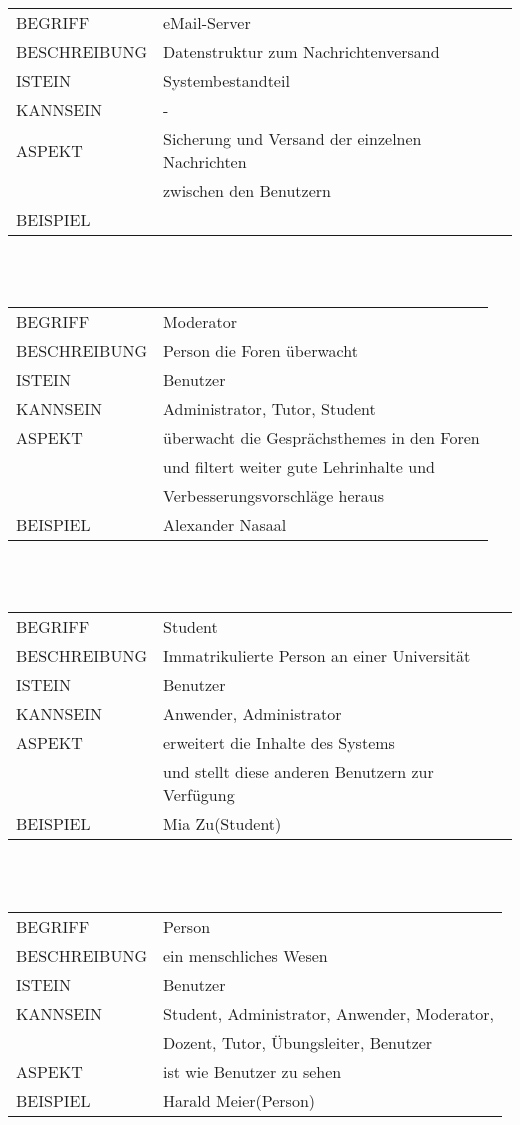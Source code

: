 \documentclass[12pt,a4paper]{article}
\begin{document}
\begin{tabular}{l p{10cm}}
BEGRIFF 	 & eMail-Server \\ 
BESCHREIBUNG & Datenstruktur zum Nachrichtenversand \\
ISTEIN   	 & Systembestandteil \\
KANNSEIN 	 & - \\ 
ASPEKT   	 & Sicherung und Versand der einzelnen Nachrichten\\
			 & zwischen den Benutzern \\
BEISPIEL 	 & \\
\hline
\end{tabular}\\\\   

\begin{tabular}{l p{10cm}}
BEGRIFF 	 & Moderator \\ 
BESCHREIBUNG & Person die Foren überwacht\\
ISTEIN   	 & Benutzer \\
KANNSEIN 	 & Administrator, Tutor, Student \\ 
ASPEKT   	 & überwacht die Gesprächsthemes in den Foren \\
 	     	 & und filtert weiter gute Lehrinhalte und\\
 	     	 & Verbesserungsvorschläge heraus\\
BEISPIEL 	 & Alexander Nasaal\\
\hline
\end{tabular}\\\\   

\begin{tabular}{l p{10cm}}
BEGRIFF 	 & Student \\ 
BESCHREIBUNG & Immatrikulierte Person an einer Universität \\ 
ISTEIN   	 & Benutzer \\
KANNSEIN 	 & Anwender, Administrator \\ 
ASPEKT   	 & erweitert die Inhalte des Systems\\
 	     	 & und stellt diese anderen Benutzern zur Verfügung \\
BEISPIEL 	 & Mia Zu(Student)\\
\hline
\end{tabular}\\\\  

\begin{tabular}{l p{10cm}}
BEGRIFF 	 & Person \\ 
BESCHREIBUNG & ein menschliches Wesen\\ 
ISTEIN   	 & Benutzer\\
KANNSEIN 	 & Student, Administrator, Anwender, Moderator,\\
			 & Dozent, Tutor, Übungsleiter, Benutzer \\ 
ASPEKT   	 & ist wie Benutzer zu sehen\\
BEISPIEL 	 & Harald Meier(Person)\\
\hline
\end{tabular}\\\\  
\end{document}
